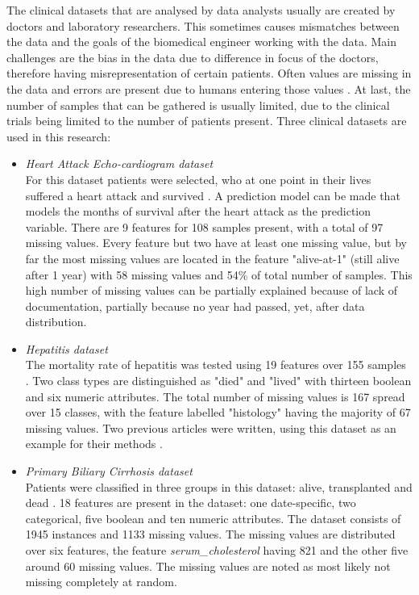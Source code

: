 \documentclass[10pt,a4paper]{report}
\begin{document}
	The clinical datasets that are analysed by data analysts usually are created by doctors and laboratory researchers. This sometimes causes mismatches between the data and the goals of the biomedical engineer working with the data. Main challenges are the bias in the data due to difference in focus of the doctors, therefore having misrepresentation of certain patients. Often values are missing in the data and errors are present due to humans entering those values \cite{pocock2013clinical}. At last, the number of samples that can be gathered is usually limited, due to the clinical trials being limited to the number of patients present. Three clinical datasets are used in this research:
	
	\begin{itemize}
		\item \textit{Heart Attack Echo-cardiogram dataset} \\ For this dataset patients were selected, who at one point in their lives suffered a heart attack and survived \cite{kan1986short}. A prediction model can be made that models the months of survival after the heart attack as the prediction variable. There are 9 features for 108 samples present, with a total of 97 missing values. Every feature but two have at least one missing value, but by far the most missing values are located in the feature "alive-at-1" (still alive after 1 year) with 58 missing values and 54\% of total number of samples. This high number of missing values can be partially explained because of lack of documentation, partially because no year had passed, yet, after data distribution. %
		\item \textit{Hepatitis dataset} \\ The mortality rate of hepatitis was tested using 19 features over 155 samples \cite{diaconis1983computer, cestnikkononenkoj}. Two class types are distinguished as "died" and "lived" with thirteen boolean and six numeric attributes. The total number of missing values is 167 spread over 15 classes, with the feature labelled "histology" having the majority of 67 missing values. Two previous articles were written, using this dataset as an example for their methods \cite{diaconis1983computer, cestnikkononenkoj}.
		\item \textit{Primary Biliary Cirrhosis dataset} \\ Patients were classified in three groups in this dataset: alive, transplanted and dead \cite{murtaugh1994primary}. 18 features are present in the dataset: one date-specific, two categorical, five boolean and ten numeric attributes. The dataset consists of 1945 instances and 1133 missing values. The missing values are distributed over six features, the feature \textit{serum\_cholesterol} having 821 and the other five around 60 missing values. The missing values are noted as most likely not missing completely at random. %
	\end{itemize}
	
\end{document}
